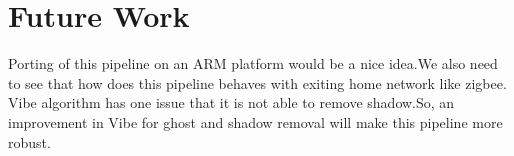 
\chapter{Future Work} %
\label{Chapter2}
Porting of this pipeline on an ARM platform would be a nice idea.We also
need to see that how does this pipeline behaves with exiting home
network like zigbee. Vibe algorithm has one issue that it is not able to
remove shadow.So, an improvement in Vibe for ghost and shadow removal
will make this pipeline more robust.



